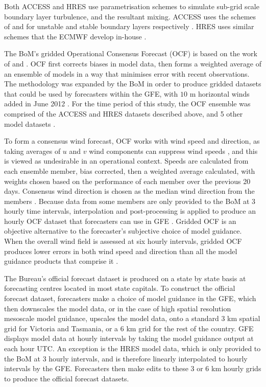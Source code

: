 \documentclass{ametsoc}
\begin{document}
Both ACCESS and HRES use parametrisation schemes to simulate sub-grid scale boundary layer turbulence, and the resultant mixing. ACCESS uses the schemes of \citet{lock00} and \citet{louis79} for unstable and stable boundary layers respectively \citep{bom10}. HRES uses similar schemes that the ECMWF develop in-house \citep{ecmwf19a}.

The BoM's gridded Operational Consensus Forecast (OCF) is based on the work of \citet{woodcock05} and \citet{engel07}. OCF first corrects biases in model data, then forms a weighted average of an ensemble of models in a way that minimises error with recent observations. The methodology was expanded by the BoM in order to produce gridded datasets that could be used by forecasters within the GFE, with $10$ m horizontal winds added in June 2012 \citep{bom05, bom08, bom12}. For the time period of this study, the OCF ensemble was comprised of the ACCESS and HRES datasets described above, and 5 other model datasets  \citep{bom18}.

To form a consensus wind forecast, OCF works with wind speed and direction, as taking averages of $u$ and $v$ wind components can suppress wind speeds \citep{glahn72}, and this is viewed as undesirable in an operational context. Speeds are calculated from each ensemble member, bias corrected, then a weighted average calculated, with weights chosen based on the performance of each member over the previous 20 days. Consensus wind direction is chosen as the median wind direction from the members \citep{bom12}. Because data from some members are only provided to the BoM at 3 hourly time intervals, interpolation and post-processing is applied to produce an hourly OCF dataset that forecasters can use in GFE \citep{bom08}. Gridded OCF is an objective alternative to the forecaster's subjective choice of model guidance. When the overall wind field is assessed at six hourly intervals, gridded OCF produces lower errors in both wind speed and direction than all the model guidance products that comprise it \citep{bom12}.

The Bureau's official forecast dataset is produced on a state by state basis at forecasting centres located in most state capitals. To construct the official forecast dataset, forecasters make a choice of model guidance in the GFE, which then downscales the model data, or in the case of high spatial resolution mesoscale model guidance, upscales the model data, onto a standard 3 km spatial grid for Victoria and Tasmania, or a 6 km grid for the rest of the country. GFE displays model data at hourly intervals by taking the model guidance output at each hour UTC. An exception is the HRES model data, which is only provided to the BoM at 3 hourly intervals, and is therefore linearly interpolated to hourly intervals by the GFE. Forecasters then make edits to these 3 or 6 km hourly grids to produce the official forecast datasets.
\end{document}
